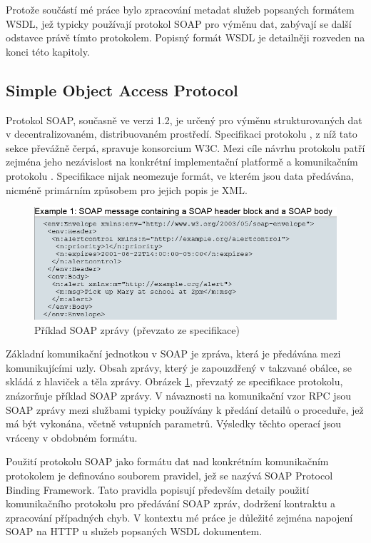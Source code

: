 \documentclass[czech,DP]{thesiskiv}
\begin{document}
Protože součástí mé práce bylo zpracování metadat služeb popsaných formátem WSDL, jež typicky používají protokol SOAP pro výměnu dat, zabývají se další odstavce právě tímto protokolem. Popisný formát WSDL je detailněji rozveden na konci této kapitoly.

\subsection{Simple Object Access Protocol} 


Protokol SOAP, současně ve verzi 1.2, je určený pro výměnu strukturovaných dat v decentralizovaném, distribuovaném prostředí. Specifikaci protokolu \cite{soap12}, z níž tato sekce převážně čerpá, spravuje konsorcium W3C. Mezi cíle návrhu protokolu patří zejména jeho nezávislost na konkrétní implementační platformě a komunikačním protokolu \cite{soap12}. Specifikace nijak neomezuje formát, ve kterém jsou data předávána, nicméně primárním způsobem pro jejich popis je XML.

\begin{figure}[h]
	\centering
	\includegraphics[width=\linewidth]{soap-msg-example}
	\caption{Příklad SOAP zprávy (převzato ze specifikace)}
	\label{fig:soap-msg-example}
\end{figure}

Základní komunikační jednotkou v SOAP je zpráva, která je předávána mezi komunikujícími uzly. Obsah zprávy, který je zapouzdřený v takzvané obálce, se skládá z hlaviček a těla zprávy. Obrázek \ref{fig:soap-msg-example}, převzatý ze specifikace protokolu, znázorňuje příklad SOAP zprávy. V návaznosti na komunikační vzor RPC jsou SOAP zprávy mezi službami typicky používány k předání detailů o proceduře, jež má být vykonána, včetně vstupních parametrů. Výsledky těchto operací jsou vráceny v obdobném formátu.

Použití protokolu SOAP jako formátu dat nad konkrétním komunikačním protokolem je definováno souborem pravidel, jež se nazývá SOAP Protocol Binding Framework. Tato pravidla popisují především detaily použití komunikačního protokolu pro předávání SOAP zpráv, dodržení kontraktu a zpracování případných chyb. V kontextu mé práce je důležité zejména napojení SOAP na HTTP u služeb popsaných WSDL dokumentem.
\end{document}
